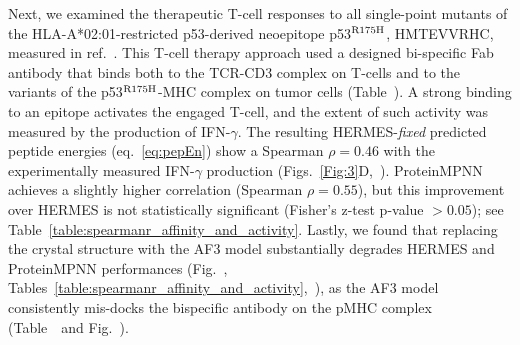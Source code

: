Next, we examined the {therapeutic T-cell responses} to all single-point mutants of the
HLA-A*02:01-restricted p53-derived {neoepitope} p53$^{\rm R175H}$, HMTEVVRHC, measured in
ref.~\cite{Hsiue2021-ag}. This T-cell therapy approach used a designed bi-specific Fab antibody that
binds both to the TCR-CD3 complex on T-cells and to the variants of the p53$^{\rm R175H}$-MHC
complex on tumor cells (Table~\AffActInfoTable). A strong binding to an {epitope} activates the
engaged T-cell, and the extent of such activity was measured by the production of IFN-$\gamma$. The
resulting HERMES-{\em fixed} predicted peptide energies (eq.~\ref{eq:pepEn}) show a {Spearman
$\rho=0.46$} with the experimentally measured IFN-$\gamma$ production
(Figs.~\ref{Fig:3}D,~\ActivityHeatmapsFigure). {ProteinMPNN achieves a slightly higher correlation
(Spearman $\rho=0.55$), but this improvement over HERMES is not statistically significant (Fisher's
z-test p-value $>0.05$); see Table~\ref{table:spearmanr_affinity_and_activity}. Lastly, we found
that replacing the crystal structure with the AF3 model substantially degrades HERMES and
ProteinMPNN performances (Fig.~\AfScoringResultsFigure,
Tables~\ref{table:spearmanr_affinity_and_activity},~\SpearmanrActivityTable), as the AF3 model
consistently mis-docks the bispecific antibody on the pMHC complex (Table~\AfMetricsTable~and
Fig.~\AfExamplesFigure).
}
 


